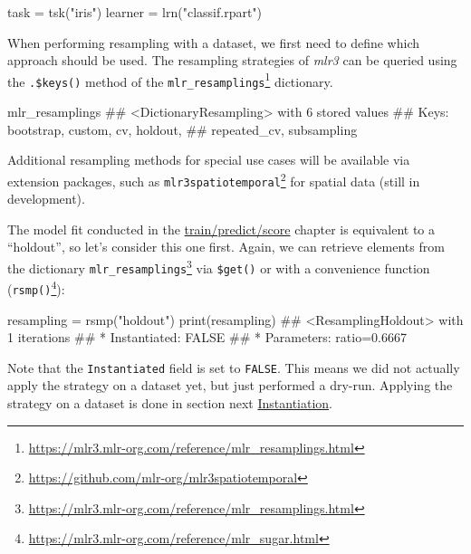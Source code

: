 \documentclass[12pt,]{scrbook}
\newenvironment{Shaded}{}{}
\newcommand{\KeywordTok}[1]{\textcolor[rgb]{0.00,0.00,1.00}{#1}}
\newcommand{\NormalTok}[1]{#1}
\newcommand{\StringTok}[1]{\textcolor[rgb]{0.00,0.50,0.50}{#1}}
\renewcommand{\href}[2]{#2\footnote{\url{#1}}}
\begin{document}
\begin{Shaded}
\begin{Highlighting}[]
\NormalTok{task =}\StringTok{ }\KeywordTok{tsk}\NormalTok{(}\StringTok{"iris"}\NormalTok{)}
\NormalTok{learner =}\StringTok{ }\KeywordTok{lrn}\NormalTok{(}\StringTok{"classif.rpart"}\NormalTok{)}
\end{Highlighting}
\end{Shaded}

When performing resampling with a dataset, we first need to define which approach should be used.
The resampling strategies of \emph{mlr3} can be queried using the \texttt{.\$keys()} method of the \href{https://mlr3.mlr-org.com/reference/mlr_resamplings.html}{\texttt{mlr\_resamplings}} dictionary.

\begin{Shaded}
\begin{Highlighting}[]
\NormalTok{mlr_resamplings}
\NormalTok{## <DictionaryResampling> with 6 stored values}
\NormalTok{## Keys: bootstrap, custom, cv, holdout,}
\NormalTok{##   repeated_cv, subsampling}
\end{Highlighting}
\end{Shaded}

Additional resampling methods for special use cases will be available via extension packages, such as \href{https://github.com/mlr-org/mlr3spatiotemporal}{\texttt{mlr3spatiotemporal}} for spatial data (still in development).

The model fit conducted in the \protect\hyperlink{train-predict}{train/predict/score} chapter is equivalent to a ``holdout'', so let's consider this one first.
Again, we can retrieve elements from the dictionary \href{https://mlr3.mlr-org.com/reference/mlr_resamplings.html}{\texttt{mlr\_resamplings}} via \texttt{\$get()} or with a convenience function (\href{https://mlr3.mlr-org.com/reference/mlr_sugar.html}{\texttt{rsmp()}}):

\begin{Shaded}
\begin{Highlighting}[]
\NormalTok{resampling =}\StringTok{ }\KeywordTok{rsmp}\NormalTok{(}\StringTok{"holdout"}\NormalTok{)}
\KeywordTok{print}\NormalTok{(resampling)}
\NormalTok{## <ResamplingHoldout> with 1 iterations}
\NormalTok{## * Instantiated: FALSE}
\NormalTok{## * Parameters: ratio=0.6667}
\end{Highlighting}
\end{Shaded}

Note that the \texttt{Instantiated} field is set to \texttt{FALSE}.
This means we did not actually apply the strategy on a dataset yet, but just performed a dry-run.
Applying the strategy on a dataset is done in section next \protect\hyperlink{instantiation}{Instantiation}.
\end{document}
